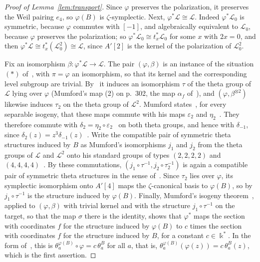 \documentclass[version=preprint]{iacrcc}
\begin{document}
    \begin{proof}[Proof of Lemma~\ref{lem:transport}]
        Since $\varphi$ preserves the polarization, it preserves the Weil pairing
        $e_4$, so $\varphi(B)$ is $\zeta$-symplectic. Next, $\varphi^*\mathcal L
        \cong \mathcal L$. Indeed $\varphi^*\mathcal L_0$ is symmetric, because
        $\varphi$ commutes with $[-1]$, and algebraically equivalent to $\mathcal
        L_0$, because $\varphi$ preserves the polarization; so $\varphi^*\mathcal
        L_0 \cong t_x^*\mathcal L_0$ for some $x$ with $2x = 0$, and then
        $\varphi^*\mathcal L \cong t_x^*(\mathcal L_0^2) \cong \mathcal L$,
        since $A'[2]$ is the kernel of the polarization of $\mathcal L_0^2$.

        Fix an isomorphism $\beta \colon \varphi^*\mathcal L \to \mathcal L$.
        The pair $(\varphi, \beta)$ is an instance of the situation $(*)$
        of~\cite[p.~290]{Mum66}, with $\pi = \varphi$ an isomorphism, so that its
        kernel and the corresponding level subgroup are trivial.
        By~\cite[Proposition 2, p.~291]{Mum66} it induces an isomorphism $\tau$
        of the theta group of $\mathcal L$ lying over $\varphi$ (Mumford's map
        (2) on p.~302, the map $\alpha_f$ of~\cite[proof of Theorem 56]{DLRW24}),
        and $(\varphi, \beta^{\otimes 2})$ likewise induces $\tau_2$ on the theta
        group of $\mathcal L^2$. Mumford states~\cite[p.~312, diagram (s), with
        $n = 2$]{Mum66}, for every separable isogeny, that these maps commute
        with his maps $\varepsilon_2$ and $\eta_2$~\cite[pp.~309--311]{Mum66}.
        They therefore commute with $\delta_2 = \eta_2 \circ
        \varepsilon_2$~\cite[Proposition 5(iii), p.~311]{Mum66} on both theta
        groups, and hence with $\delta_{-1}$, since $\delta_2(z) = z^3
        \delta_{-1}(z)$~\cite[p.~312]{Mum66}. Write the compatible pair of
        symmetric theta structures induced by $B$ as Mumford's isomorphisms $j_1$
        and $j_2$ from the theta groups of $\mathcal L$ and $\mathcal L^2$ onto
        his standard groups of types $(2, 2, 2, 2)$ and $(4, 4, 4,
        4)$~\cite[p.~317]{Mum66}. By these commutations, $(j_1 \circ \tau^{-1},
        j_2 \circ \tau_2^{-1})$ is again a compatible pair of symmetric theta
        structures in the sense of~\cite[p.~317]{Mum66}. Since $\tau_2$ lies over
        $\varphi$, its symplectic isomorphism onto $A'[4]$ maps the
        $\zeta$-canonical basis to $\varphi(B)$, so by~\cite[Theorem
        5(ii)]{Dar24} $j_1 \circ \tau^{-1}$ is the structure induced by
        $\varphi(B)$. Finally, Mumford's isogeny theorem~\cite[Theorem 4,
        pp.~302--303]{Mum66}, applied to $(\varphi, \beta)$ with trivial kernel
        and with the structure $j_1 \circ \tau^{-1}$ on the target, so that the
        map $\sigma$ there is the identity, shows that $\varphi^*$ maps the
        section with coordinates $f$ for the structure induced by $\varphi(B)$ to
        $c$ times the section with coordinates $f$ for the structure induced by
        $B$, for a constant $c \in \Bbbk^*$. In the form of~\cite[Theorem
        3]{Dar24}, this is $\theta^{\varphi(B)}_a \circ \varphi = c\,
        \theta^B_a$ for all $a$, that is, $\theta^{\varphi(B)}_a(\varphi(z)) = c\,
        \theta^B_a(z)$, which is the first assertion.


\end{proof}
\end{document}
